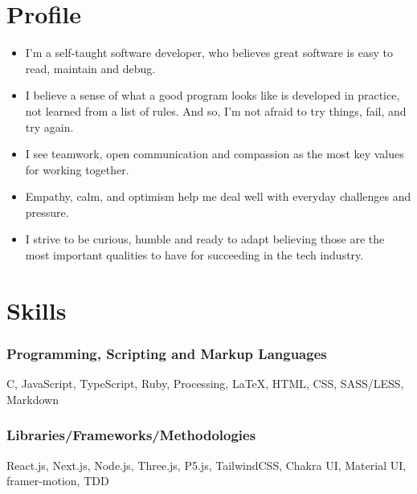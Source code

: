 \documentclass[11pt, oneside, a4paper, titlepage]{article}
\newcommand\skillsVSpace{\vspace{-0.3cm}}
\begin{document}
\begin{tcolorbox}
  \begin{minipage}[t]{8cm}
    \vspace*{-0.5cm}
    \begin{tcolorbox}[grow to left by=0.6cm,colback=gray!25,colframe=white]

      \section*{Profile}
      \begin{itemize}
        \item{
      I'm a self-taught software developer,
      who believes great software is easy to read,
      maintain and debug.
          }
        \skillsVSpace
      \item{
      I believe a sense of what a good program looks like
      is developed in practice, not learned from a list of rules.
      And so, I'm not afraid to try things, fail, and try again.
       }
        \skillsVSpace
        \item{
      I see teamwork, open communication and compassion
      as the most key values for working together.
          }
        \skillsVSpace
        \item{
      Empathy, calm, and optimism
      help me deal well with everyday challenges and pressure.
        }
        \skillsVSpace
      \item{
      I strive to be curious, humble and ready to adapt
      believing those are the most important qualities to have
      for succeeding in the tech industry.
        }
      \end{itemize}


      \section*{Skills}
        \subsubsection{Programming, Scripting and Markup Languages}
        C, JavaScript, TypeScript, Ruby, Processing, {\LaTeX}, HTML, CSS, SASS/LESS, Markdown
        \skillsVSpace
        \subsubsection{Libraries/Frameworks/Methodologies}
        React.js, Next.js, Node.js, Three.js, P5.js, TailwindCSS, Chakra UI, Material UI, framer-motion, TDD


\end{tcolorbox}
\end{minipage}
\end{tcolorbox}
\end{document}
